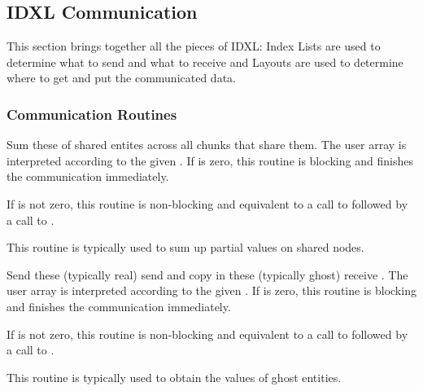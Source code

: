 \subsection{IDXL Communication}
\label{sec:IDXL_Comm}
This section brings together all the pieces of IDXL: Index Lists are used to determine what to send and what to receive and Layouts are used to determine where to get and put the communicated data.


\subsubsection{Communication Routines}


Sum these  of shared entites across all chunks that share them.
The user  array is interpreted according to the given .
If  is zero, this routine is blocking and finishes the communication immediately.

If  is not zero, this routine is non-blocking and equivalent to a call to 
 followed by a call to .

This routine is typically used to sum up partial values on shared nodes.



Send these (typically real) send  and copy in these 
(typically ghost) receive .
The user  array is interpreted according to the given .
If  is zero, this routine is blocking and finishes the communication immediately.

If  is not zero, this routine is non-blocking and equivalent to a call to 
 followed by a call to .

This routine is typically used to obtain the values of ghost entities.



